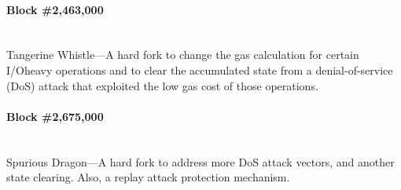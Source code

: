 \paragraph{Block \#2,463,000} \ \\
Tangerine Whistle—A hard fork to change the gas calculation for certain I/Oheavy operations and to clear the accumulated state from a denial-of-service
(DoS) attack that exploited the low gas cost of those operations.

\paragraph{Block \#2,675,000} \ \\
Spurious Dragon—A hard fork to address more DoS attack vectors, and another
state clearing. Also, a replay attack protection mechanism.